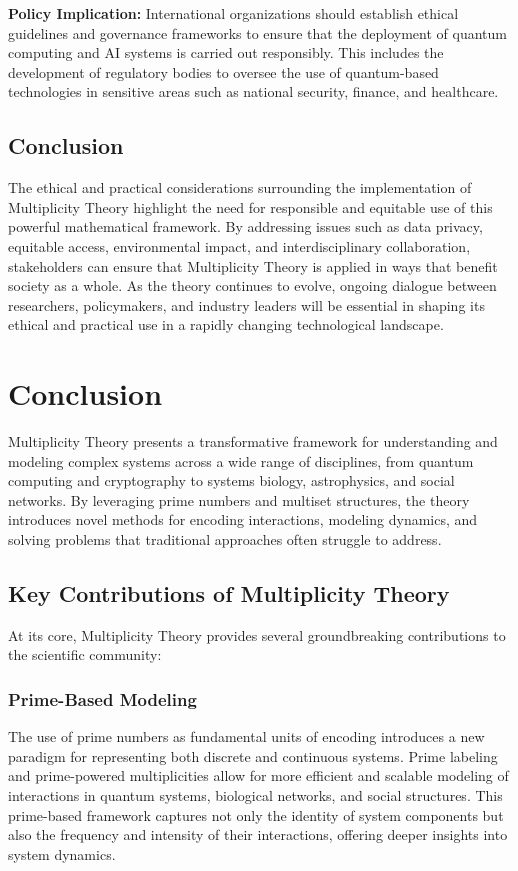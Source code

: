 \documentclass[%
 preprint, linenumbers,
 amsmath,amssymb,
 aps, physrev,
]{revtex4-2}
\begin{document}
\textbf{Policy Implication:} International organizations should establish ethical guidelines and governance frameworks to ensure that the deployment of quantum computing and AI systems is carried out responsibly. This includes the development of regulatory bodies to oversee the use of quantum-based technologies in sensitive areas such as national security, finance, and healthcare.

\subsection{Conclusion}
The ethical and practical considerations surrounding the implementation of Multiplicity Theory highlight the need for responsible and equitable use of this powerful mathematical framework. By addressing issues such as data privacy, equitable access, environmental impact, and interdisciplinary collaboration, stakeholders can ensure that Multiplicity Theory is applied in ways that benefit society as a whole. As the theory continues to evolve, ongoing dialogue between researchers, policymakers, and industry leaders will be essential in shaping its ethical and practical use in a rapidly changing technological landscape.
\section{Conclusion}
\label{sec:Conclusion}

Multiplicity Theory presents a transformative framework for understanding and modeling complex systems across a wide range of disciplines, from quantum computing and cryptography to systems biology, astrophysics, and social networks. By leveraging prime numbers and multiset structures, the theory introduces novel methods for encoding interactions, modeling dynamics, and solving problems that traditional approaches often struggle to address.

\subsection{Key Contributions of Multiplicity Theory}
At its core, Multiplicity Theory provides several groundbreaking contributions to the scientific community:

\subsubsection{Prime-Based Modeling}
The use of prime numbers as fundamental units of encoding introduces a new paradigm for representing both discrete and continuous systems. Prime labeling and prime-powered multiplicities allow for more efficient and scalable modeling of interactions in quantum systems, biological networks, and social structures. This prime-based framework captures not only the identity of system components but also the frequency and intensity of their interactions, offering deeper insights into system dynamics.
\end{document}
